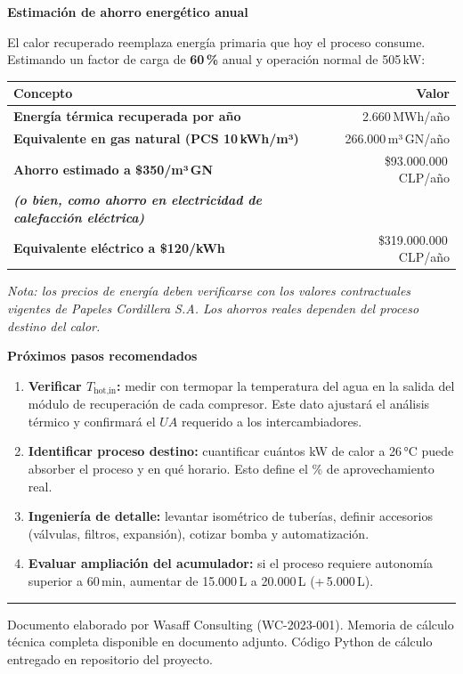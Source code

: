 \documentclass[11pt,a4paper]{article}
\begin{document}
\vspace{0.4cm}

\begin{center}
\textbf{\color{navyblue}Estimación de ahorro energético anual}
\end{center}

El calor recuperado reemplaza energía primaria que hoy el proceso consume. Estimando un
factor de carga de \textbf{60\,\%} anual y operación normal de 505\,kW:

\begin{tabular}{@{}>{\bfseries}p{8cm}r@{}}
\toprule
Concepto & Valor \\
\midrule
Energía térmica recuperada por año & 2.660\,MWh/año \\
Equivalente en gas natural (PCS 10\,kWh/m³) & 266.000\,m³\,GN/año \\
Ahorro estimado a \$350/m³\,GN & \$93.000.000\,CLP/año \\
\textit{(o bien, como ahorro en electricidad de calefacción eléctrica)} & \\
Equivalente eléctrico a \$120/kWh & \$319.000.000\,CLP/año \\
\bottomrule
\end{tabular}

{\small\color{gray}
  \textit{Nota: los precios de energía deben verificarse con los valores contractuales
  vigentes de Papeles Cordillera S.A. Los ahorros reales dependen del proceso destino del calor.}
}

\vspace{0.4cm}

\begin{center}
\textbf{\color{navyblue}Próximos pasos recomendados}
\end{center}

\begin{enumerate}
  \item \textbf{Verificar $T_{\text{hot,in}}$:} medir con termopar la temperatura del agua
    en la salida del módulo de recuperación de cada compresor. Este dato ajustará el análisis
    térmico y confirmará el $UA$ requerido a los intercambiadores.
  \item \textbf{Identificar proceso destino:} cuantificar cuántos kW de calor a 26\,°C
    puede absorber el proceso y en qué horario. Esto define el \% de aprovechamiento real.
  \item \textbf{Ingeniería de detalle:} levantar isométrico de tuberías, definir accesorios
    (válvulas, filtros, expansión), cotizar bomba y automatización.
  \item \textbf{Evaluar ampliación del acumulador:} si el proceso requiere autonomía superior
    a 60\,min, aumentar de 15.000\,L a 20.000\,L (+\,5.000\,L).
\end{enumerate}

\noindent\rule{\textwidth}{1pt}
{\small\color{gray}
  Documento elaborado por Wasaff Consulting (WC-2023-001). Memoria de cálculo técnica
  completa disponible en documento adjunto. Código Python de cálculo entregado en
  repositorio del proyecto.
}
\end{document}
